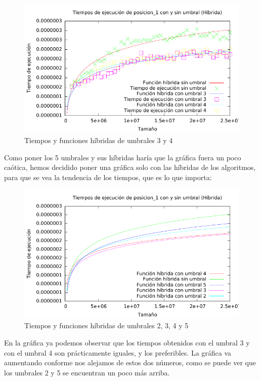 \begin{figure}[H]\includegraphics[width=13cm]{img/posicion_1_comparativa_umbral2.pdf} \centering
	\caption{Tiempos y funciones híbridas de umbrales 3 y 4}\end{figure}

Como poner los 5 umbrales y sus híbridas haría que la gráfica fuera un poco caótica, hemos decidido poner una gráfica solo con las híbridas de los algoritmos, para que se vea la tendencia de los tiempos, que es lo que importa:

\begin{figure}[H]\includegraphics[width=13cm]{img/posicion_1_comparativa_umbral5.pdf} \centering
	\caption{Tiempos y funciones híbridas de umbrales 2, 3, 4 y 5}\end{figure}

En la gráfica ya podemos observar que los tiempos obtenidos con el umbral 3 y con el umbral 4 son prácticamente iguales, y los preferibles. La gráfica va aumentando conforme nos alejamos de estos dos números, como se puede ver que los umbrales 2 y 5 se encuentran un poco más arriba. \\

